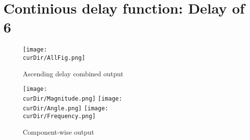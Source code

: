 \newpage
\newcommand{\curDir}{PMUsim-figures/Cont/DelayOf_6}
\section{Continious delay function: Delay of 6}
\begin{figure}[hb]
    \texttt{[image: \\curDir/AllFig.png]}    
    \caption{Ascending delay combined output}
    \label{fig:PMUsim-Asc6-allfig}
\end{figure}


     \begin{figure}
        \caption{Component-wise output}
 
    \texttt{[image: \\curDir/Magnitude.png]}    
         \label{fig:PMUsim-Asc6Mag}
   \texttt{[image: \\curDir/Angle.png]}    
         \label{fig:PMUsim-Asc6Ang}
   \texttt{[image: \\curDir/Frequency.png]}    
         \label{fig:PMUsim-Asc6Freq}
 
\end{figure}


